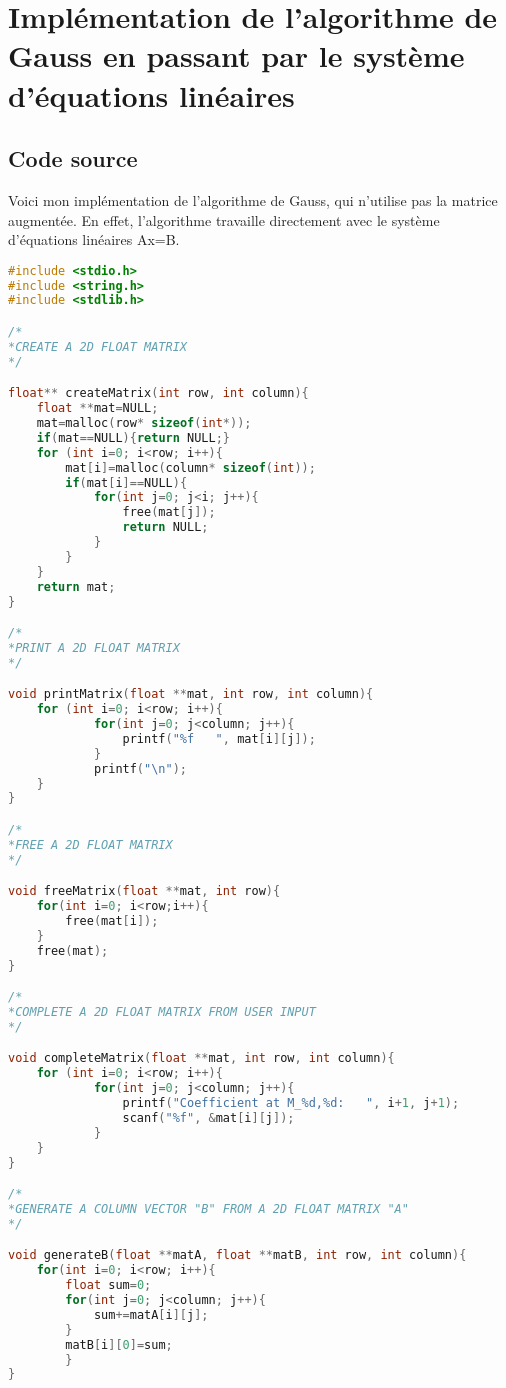 \lstset{
  firstnumber=0, 
  numbers=left,               
  frame=single,
  language=C,                                       
  showstringspaces=false
}
\section{Implémentation de l'algorithme de Gauss en passant par le système d'équations linéaires}
\subsection{Code source}
Voici mon implémentation de l'algorithme de Gauss, qui n'utilise pas la matrice augmentée. En effet, l'algorithme travaille directement avec le système d'équations linéaires Ax=B.\\
\begin{lstlisting}[language=C,inputencoding=utf8, basicstyle=\fontsize{8}{10}\selectfont]
#include <stdio.h>
#include <string.h>
#include <stdlib.h>

/*
*CREATE A 2D FLOAT MATRIX
*/

float** createMatrix(int row, int column){
	float **mat=NULL;
	mat=malloc(row* sizeof(int*));
	if(mat==NULL){return NULL;}
	for (int i=0; i<row; i++){
		mat[i]=malloc(column* sizeof(int));
		if(mat[i]==NULL){
			for(int j=0; j<i; j++){
				free(mat[j]);
				return NULL;
			}
		}
	}
	return mat;
}

/*
*PRINT A 2D FLOAT MATRIX
*/

void printMatrix(float **mat, int row, int column){
	for (int i=0; i<row; i++){
    		for(int j=0; j<column; j++){
         		printf("%f   ", mat[i][j]);
    		}
    		printf("\n");
	}
}

/*
*FREE A 2D FLOAT MATRIX
*/

void freeMatrix(float **mat, int row){
	for(int i=0; i<row;i++){
		free(mat[i]);
	}
	free(mat);
}

/*
*COMPLETE A 2D FLOAT MATRIX FROM USER INPUT
*/

void completeMatrix(float **mat, int row, int column){
	for (int i=0; i<row; i++){
    		for(int j=0; j<column; j++){
    			printf("Coefficient at M_%d,%d:   ", i+1, j+1);
         		scanf("%f", &mat[i][j]);
    		}
	}
}

/*
*GENERATE A COLUMN VECTOR "B" FROM A 2D FLOAT MATRIX "A"
*/

void generateB(float **matA, float **matB, int row, int column){
	for(int i=0; i<row; i++){
		float sum=0;
		for(int j=0; j<column; j++){
			sum+=matA[i][j];
		}
		matB[i][0]=sum;
    	}
}


\end{lstlisting}
